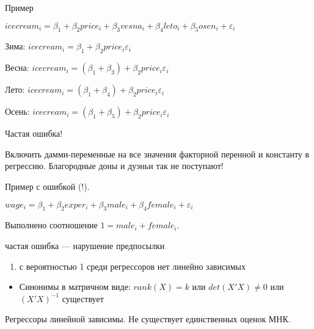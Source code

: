 \documentclass[ignorenonframetext,]{beamer}
\begin{document}
\begin{frame}{Пример}

$icecream_i=\beta_1 + \beta_2 price_i + \beta_3 vesna_i + \beta_4 leto_i + \beta_5 osen_i + \varepsilon_i$

Зима: $icecream_i=\beta_1 + \beta_2 price_i \varepsilon_i$

Весна: $icecream_i=(\beta_1 + \beta_3) + \beta_2 price_i \varepsilon_i$

Лето: $icecream_i=(\beta_1 + \beta_4) + \beta_2 price_i \varepsilon_i$

Осень: $icecream_i=(\beta_1 + \beta_5) + \beta_2 price_i \varepsilon_i$

\end{frame}

\begin{frame}{Частая ошибка!}

Включить дамми-переменные на все значения факторной перенной и константу
в регрессию. Благородные доны и дуэньи так не поступают!

Пример с ошибкой (!).

$wage_i = \beta_1 + \beta_2 exper_i + \beta_3 male_i + \beta_4 female_i +\varepsilon_i$

Выполнено соотношение $1 = male_i + female_i$.

\end{frame}

\begin{frame}{частая ошибка --- нарушение предпосылки}

\begin{enumerate}
\def\labelenumi{\arabic{enumi}.}
\setcounter{enumi}{7}
\itemsep1pt\parskip0pt
\item
  с вероятностью 1 среди регрессоров нет линейно зависимых
\end{enumerate}

\begin{itemize}
\itemsep1pt\parskip0pt
\item
  Синонимы в матричном виде: $rank(X)=k$ или $det(X'X)\neq 0$ или
  $(X'X)^{-1}$ существует
\end{itemize}

Регрессоры линейной зависимы. Не существует единственных оценок МНК.

\end{frame}
\end{document}
